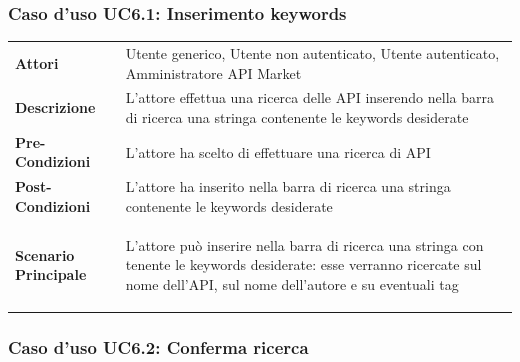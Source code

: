 \subsubsection{Caso d'uso UC6.1: Inserimento keywords}
\label{UC6_1}

\begin{minipage}{\linewidth}
\begin{tabular}{ l | p{11cm}}
	\hline
	\rowcolor{Gray}
	 \multicolumn{2}{c}{UC6.1 - Inserimento keywords} \\
	 \hline
	\textbf{Attori} & Utente generico, Utente non autenticato, Utente autenticato, Amministratore API Market \\
	\textbf{Descrizione} & L'attore effettua una ricerca delle API inserendo nella barra di ricerca una stringa contenente le keywords desiderate \\
	\textbf{Pre-Condizioni} & L'attore ha scelto di effettuare una ricerca di API \\
	\textbf{Post-Condizioni} & L'attore ha inserito nella barra di ricerca una stringa contenente le keywords desiderate \\
	\textbf{Scenario Principale} & 
	\begin{enumerate*}[label=(\arabic*.),itemjoin={\newline}]
		\item L'attore può inserire nella barra di ricerca una stringa con tenente le keywords desiderate: esse verranno ricercate sul nome dell'API, sul nome dell'autore e su eventuali tag
	\end{enumerate*}\\
\end{tabular}
\end{minipage}

\subsubsection{Caso d'uso UC6.2: Conferma ricerca}
\label{UC6_2}

